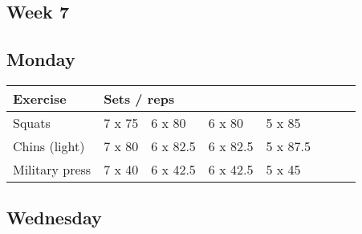 \documentclass[12pt, a4paper]{article}%
\begin{document}
 \subsection*{\hspace{0.25em} Week 7 }
  \subsection*{\hspace{0.5em} Monday }


  \begin{tabular}{l|lllllll}
  \hspace{0.75em} \textbf{Exercise} & \multicolumn{ 7 }{l}{ \textbf{Sets / reps} } \\ \hline

            \hspace{0.75em} Squats
            & 7 x 75
            & 6 x 80
            & 6 x 80
            & 5 x 85
            & 
            & 
            & 
            \\


            \hspace{0.75em} Chins (light)
            & 7 x 80
            & 6 x 82.5
            & 6 x 82.5
            & 5 x 87.5
            & 
            & 
            & 
            \\


            \hspace{0.75em} Military press
            & 7 x 40
            & 6 x 42.5
            & 6 x 42.5
            & 5 x 45
            & 
            & 
            & 
            \\


  \end{tabular}

  \subsection*{\hspace{0.5em} Wednesday }
\end{document}
